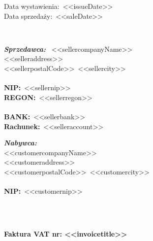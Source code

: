 \documentclass[12pt]{article}
\newcommand{\nipText}{\textbf{NIP:}}
\newcommand{\regonText}{\textbf{REGON:}}
\newcommand{\bankText}{\textbf{BANK:}}
\newcommand{\accountText}{\textbf{Rachunek:}}
\begin{document}
    \begin{footnotesize}
        \begin{flushright}
            \begin{minipage}[t]{.4\textwidth}
                Data wystawienia:~<<issueDate>> \\
                Data sprzedaży:~<<saleDate>>
            \end{minipage}
        \end{flushright}
    \end{footnotesize}

    \ \\

    \begin{small}
        \begin{minipage}[t]{.6\textwidth}
            \textbf{\emph{Sprzedawca:}} \
            <<sellercompanyName>> \\
            <<selleraddress>> \\
            <<sellerpostalCode>>~<<sellercity>> \\ \\
            \nipText~<<sellernip>> \\
            \regonText~<<sellerregon>> \\ \\
            \bankText~<<sellerbank>> \\
            \accountText~<<selleraccount>>
        \end{minipage}
        \begin{minipage}[t]{\textwidth}
            \textbf{\emph{Nabywca:}} \\
            <<customercompanyName>> \\
            <<customeraddress>> \\
            <<customerpostalCode>>~<<customercity>> \\ \\
            \nipText~<<customernip>>
        \end{minipage}
    \end{small}

    \ \\ \ \\

    \centerline{\textbf{\LARGE{Faktura VAT nr: <<invoicetitle>>}}}

    \ \\
\end{document}
